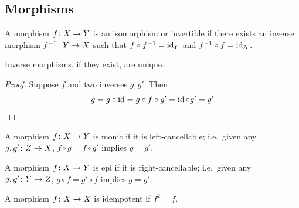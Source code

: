 \subsection*{Morphisms}

\begin{definition}
    A morphism \(f\colon X\to Y\) is an isomorphism or invertible
    if there exists an inverse morphism \(f^{-1}\colon Y\to X\)
    such that \(f \circ f^{-1} = \operatorname{id}_Y\) and \(f^{-1} \circ f = \operatorname{id}_X\).
\end{definition}
\begin{lemma}
    Inverse morphisms, if they exist, are unique.
\end{lemma}
\begin{proof}
    Suppose \(f\) and two inverses \(g,g'\).
    Then
    \begin{equation*}
        g = g \circ \operatorname{id} = g \circ f \circ g' = \operatorname{id} \circ g' = g'
    \end{equation*}
\end{proof}

\begin{definition}
    A morphism \(f\colon X\to Y\) is monic if it is left-cancellable;
    i.e.\ given any \(g,g'\colon Z\to X\), \(f \circ g = f \circ g'\) implies \(g = g'\).
\end{definition}
\begin{definition}
    A morphism \(f\colon X\to Y\) is epi if it is right-cancellable;
    i.e.\ given any \(g,g'\colon Y\to Z\), \(g \circ f = g' \circ f\) implies \(g = g'\).
\end{definition}

\begin{definition}
    A morphism \(f\colon X\to X\) is idempotent if \(f^2 = f\).
\end{definition}

